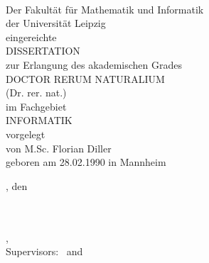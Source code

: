 %
\begin{comment}
\begin{titlepage}
	\pdfbookmark[0]{Cover}{Cover}
	\flushright
	\hfill
	\vfill
	{\LARGE\thesisTitle \par}
	\rule[5pt]{\textwidth}{.4pt} \par
	{\Large\thesisName}
	\vfill
	\textit{\large\thesisDate} \\
	Version: \thesisVersion
\end{titlepage}
\end{comment}


\begin{titlepage}
	\normalfont
	\centering

	\vfill
	\vspace*{15mm}
	{\tgherosfont \huge \thesisTitle \\[10mm]}
	{\large Der Fakultät für Mathematik und Informatik}\\
	{\large der Universität Leipzig}\\
	{\large eingereichte}\\[10mm]
	{\large DISSERTATION}\\[10mm]
	{\large zur Erlangung des akademischen Grades}\\[7mm]
	{\large DOCTOR RERUM NATURALIUM}\\
	{\large (Dr. rer. nat.)}\\[7mm]
	{\large im Fachgebiet}\\[7mm]
	{\large INFORMATIK}\\[7mm]
	{\large vorgelegt}\\[10mm]
	{\large von M.Sc. Florian Diller}\\
	{\large geboren am 28.02.1990 in Mannheim}\\[20mm]
	\raggedright
	{\large \thesisUniversityCity, den \thesisDate}


\end{titlepage}


\hfill
\vfill
{
	\small
	\textbf{\thesisName} \\
	\textit{\thesisTitle} \\
	\thesisSubject, \thesisDate \\
	Supervisors: \thesisFirstSupervisor\ and \thesisSecondSupervisor \\[1.5em]
	\textbf{\thesisUniversity} \\
	\textit{\thesisUniversityGroup} \\
	\thesisUniversityDepartment \\
	\thesisUniversityStreetAddress \\
	\thesisUniversityPostalCode\ \thesisUniversityCity
}
